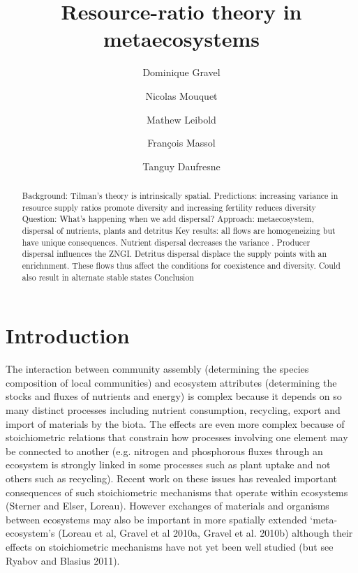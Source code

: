 \documentclass[letterpaper,twocolumn,showkeys]{revtex4-1}
\begin{document}
\title{Resource-ratio theory in metaecosystems}

\author{Dominique Gravel}
\author{Nicolas Mouquet}
\author{Mathew Leibold}
\author{François Massol}
\author{Tanguy Daufresne}

\begin{abstract}
Background: Tilman's theory is intrinsically spatial. Predictions: increasing variance in resource supply ratios promote diversity and increasing fertility reduces diversity 
Question: What's happening when we add dispersal?
Approach: metaecosystem, dispersal of nutrients, plants and detritus
Key results: all flows are homogeneizing but have unique consequences. Nutrient dispersal decreases the variance . Producer dispersal influences the ZNGI. Detritus dispersal displace the supply points with an enrichnment. These flows thus affect the conditions for coexistence and diversity. Could also result in alternate stable states
Conclusion
\end{abstract}


\maketitle

\section{Introduction}


The interaction between community assembly (determining the species composition of local communities) and ecosystem attributes (determining the stocks and fluxes of nutrients and energy) is complex because it depends on so many distinct processes including nutrient consumption, recycling, export and import of materials by the biota.  The effects are even more complex because of stoichiometric relations that constrain how processes involving one element may be connected to another (e.g. nitrogen and phosphorous fluxes through an ecosystem is strongly linked in some processes such as plant uptake and not others such as recycling). Recent work on these issues has revealed important consequences of such stoichiometric mechanisms that operate within ecosystems (Sterner and Elser, Loreau).  However exchanges of materials and organisms between ecosystems may also be important in more spatially extended ‘meta-ecosystem’s (Loreau et al, Gravel et al 2010a, Gravel et al. 2010b) although their effects on stoichiometric mechanisms have not yet been well studied (but see Ryabov and Blasius 2011).
\end{document}
